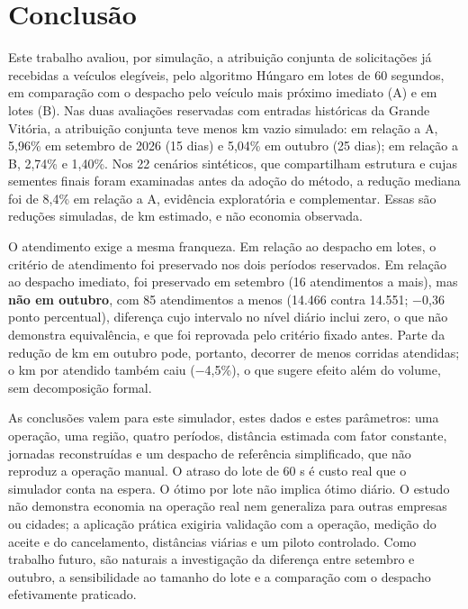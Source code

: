\section{Conclusão}

Este trabalho avaliou, por simulação, a atribuição conjunta de solicitações já recebidas a veículos elegíveis, pelo algoritmo Húngaro em lotes de 60 segundos, em comparação com o despacho pelo veículo mais próximo imediato (A) e em lotes (B). Nas duas avaliações reservadas com entradas históricas da Grande Vitória, a atribuição conjunta teve menos km vazio simulado: em relação a A, 5,96\% em setembro de 2026 (15 dias) e 5,04\% em outubro (25 dias); em relação a B, 2,74\% e 1,40\%. Nos 22 cenários sintéticos, que compartilham estrutura e cujas sementes finais foram examinadas antes da adoção do método, a redução mediana foi de 8,4\% em relação a A, evidência exploratória e complementar. Essas são reduções simuladas, de km estimado, e não economia observada.

O atendimento exige a mesma franqueza. Em relação ao despacho em lotes, o critério de atendimento foi preservado nos dois períodos reservados. Em relação ao despacho imediato, foi preservado em setembro (16 atendimentos a mais), mas \textbf{não em outubro}, com 85 atendimentos a menos (14.466 contra 14.551; −0,36 ponto percentual), diferença cujo intervalo no nível diário inclui zero, o que não demonstra equivalência, e que foi reprovada pelo critério fixado antes. Parte da redução de km em outubro pode, portanto, decorrer de menos corridas atendidas; o km por atendido também caiu (−4,5\%), o que sugere efeito além do volume, sem decomposição formal.

As conclusões valem para este simulador, estes dados e estes parâmetros: uma operação, uma região, quatro períodos, distância estimada com fator constante, jornadas reconstruídas e um despacho de referência simplificado, que não reproduz a operação manual. O atraso do lote de 60 s é custo real que o simulador conta na espera. O ótimo por lote não implica ótimo diário. O estudo não demonstra economia na operação real nem generaliza para outras empresas ou cidades; a aplicação prática exigiria validação com a operação, medição do aceite e do cancelamento, distâncias viárias e um piloto controlado. Como trabalho futuro, são naturais a investigação da diferença entre setembro e outubro, a sensibilidade ao tamanho do lote e a comparação com o despacho efetivamente praticado.
